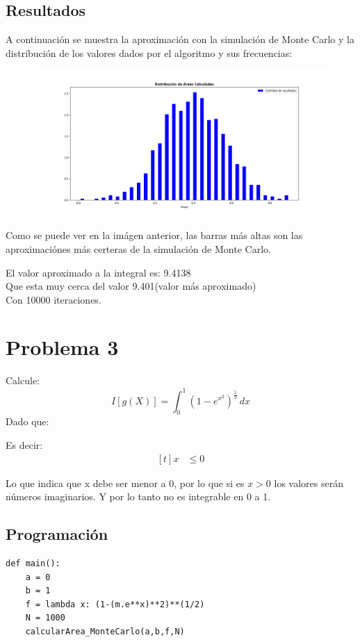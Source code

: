 \documentclass[a4paper,12pt]{article}
\newcommand{\eq}[1]{$#1$}
\begin{document}
    \subsection{Resultados}
    A continuación se muestra la aproximación con la simulación de Monte Carlo y 
    la distribución de los valores dados por el algoritmo y sus frecuencias:
    \begin{figure}[h]
        \centering
        \includegraphics[width=\textwidth]{ejer2.png}
    \end{figure}

    Como se puede ver en la imágen anterior, las barras más altas son 
    las aproximaciónes más certeras de la simulación de Monte Carlo.

    El valor aproximado a la integral es: 9.4138\\
    Que esta muy cerca del valor 9.401(valor más aproximado)\\
    Con 10000 iteraciones.
    \newpage
    \section{Problema 3}
    Calcule:
    \begin{equation}
        I[g(X)] = \int_{0}^{1} (1 - e^{x^2})^{\frac{1}{2}} \,dx
    \end{equation}
    Dado que:

Es decir:
\[
	\begin{aligned}[t]
		x &\le 0
	\end{aligned}
\]

Lo que indica que x debe ser menor a 0,  por lo que si es \eq{x > 0} los valores serán  números imaginarios. Y por lo tanto no es integrable en 0 a 1.

\subsection{Programación}
\begin{lstlisting}
def main():
    a = 0
    b = 1
    f = lambda x: (1-(m.e**x)**2)**(1/2)
    N = 1000
    calcularArea_MonteCarlo(a,b,f,N)
\end{lstlisting}
\end{document}
